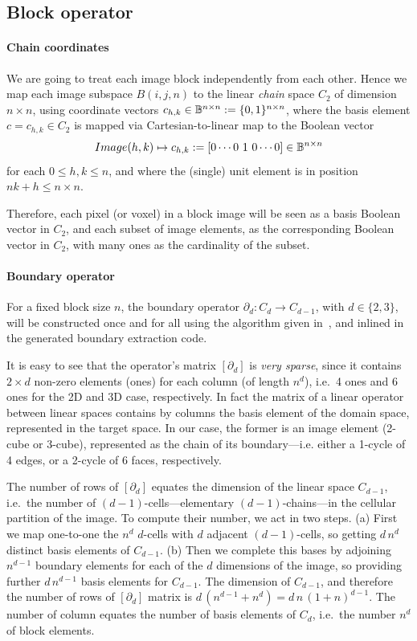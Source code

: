 \subsection{Block operator }\label{sec:block}

\paragraph{Chain coordinates }\label{sec:bbbb} 
We are going to treat each image block independently from each other. Hence we map each image subspace $B(i,j,n)$ to the linear \emph{chain} space $C_2$ of dimension $n\times n$, using coordinate vectors $c_{h,k}\in \mathbb{B}^{n\times n} := \{0,1\}^{n\times n}$, where the basis element $c = c_{h,k} \in C_2$ is mapped via Cartesian-to-linear map to the Boolean vector 
\[
Image(h,k) \mapsto c_{h,k} := [0 \cdots 0\ 1\ 0 \cdots 0] \in \mathbb{B}^{n\times n}
\]
for each $0\leq h,k \leq n$, and where the (single) unit element is in position $nk + h \leq n\times n$.

Therefore, each pixel (or voxel) in a block image will be seen as a basis Boolean vector in $C_2$, and each subset of image elements, as the corresponding Boolean vector in $C_2$, with many ones as the cardinality of the subset.

\paragraph{Boundary operator }\label{sec:bbbb} For a fixed block size $n$, the boundary operator $\partial_d : C_d\to C_{d-1}$, with $d\in\{2,3\}$, will be constructed once and for all using the algorithm given in~\cite{}, and inlined in the generated boundary extraction code.

It is easy to see that the operator's matrix $[\partial_d]$ is \emph{very sparse}, since it contains $2\times d$ non-zero elements (ones) for each column (of length $n^d$), i.e.~4 ones and 6 ones for the 2D and 3D case, respectively. In fact the matrix of a linear operator between linear spaces contains by columns the basis element of the domain space, represented in the target space. In our case, the former is an image element (2-cube or 3-cube), represented as the chain of its boundary---i.e. either a 1-cycle of 4 edges, or  a 2-cycle of 6 faces, respectively.  

The number of rows of $[\partial_d]$ equates the dimension of the linear space $C_{d-1}$, i.e.~the number of $(d-1)$-cells---elementary $(d-1)$-chains---in the cellular partition of the image. To compute their number, we act in two steps. (a) First we map one-to-one the $n^d$ $d$-cells with $d$ adjacent $(d-1)$-cells, so getting $d\,n^d$ distinct basis elements of $C_{d-1}$. (b) Then we complete this bases by adjoining $n^{d-1}$ boundary elements for each of the $d$ dimensions of the image, so providing further $d\,n^{d-1}$ basis elements for $C_{d-1}$. The dimension of $C_{d-1}$, and therefore the number of rows of $[\partial_d]$ matrix is $d\,(n^{d-1}+n^{d}) = d\,n\,(1+n)^{d-1}$. The number of column equates the number of basis elements of $C_d$, i.e.~the number $n^d$ of block elements.

